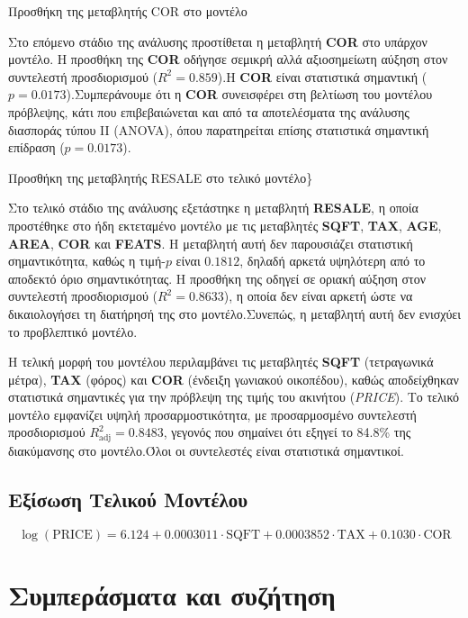 \documentclass[
  10pt,
]{article}
\begin{document}
Προσθήκη της μεταβλητής COR στο μοντέλο

Στο επόμενο στάδιο της ανάλυσης προστίθεται η μεταβλητή \textbf{COR} στο
υπάρχον μοντέλο. Η προσθήκη της \textbf{COR} οδήγησε σεμικρή αλλά
αξιοσημείωτη αύξηση στον συντελεστή προσδιορισμού (\(R^2 = 0.859\)).Η
\textbf{COR} είναι στατιστικά σημαντική (\(p = 0.0173\)).Συμπεράνουμε
ότι η \textbf{COR} συνεισφέρει στη βελτίωση του μοντέλου πρόβλεψης, κάτι
που επιβεβαιώνεται και από τα αποτελέσματα της ανάλυσης διασποράς τύπου
II (ANOVA), όπου παρατηρείται επίσης στατιστικά σημαντική επίδραση
(\(p = 0.0173\)).

Προσθήκη της μεταβλητής RESALE στο τελικό μοντέλο\}

Στο τελικό στάδιο της ανάλυσης εξετάστηκε η μεταβλητή \textbf{RESALE}, η
οποία προστέθηκε στο ήδη εκτεταμένο μοντέλο με τις μεταβλητές
\textbf{SQFT}, \textbf{TAX}, \textbf{AGE}, \textbf{AREA}, \textbf{COR}
και \textbf{FEATS}. Η μεταβλητή αυτή δεν παρουσιάζει στατιστική
σημαντικότητα, καθώς η τιμή-\(p\) είναι \(0.1812\), δηλαδή αρκετά
υψηλότερη από το αποδεκτό όριο σημαντικότητας. Η προσθήκη της οδηγεί σε
οριακή αύξηση στον συντελεστή προσδιορισμού (\(R^2 = 0.8633\)), η οποία
δεν είναι αρκετή ώστε να δικαιολογήσει τη διατήρησή της στο
μοντέλο.Συνεπώς, η μεταβλητή αυτή δεν ενισχύει το προβλεπτικό μοντέλο.

Η τελική μορφή του μοντέλου περιλαμβάνει τις μεταβλητές \textbf{SQFT}
(τετραγωνικά μέτρα), \textbf{TAX} (φόρος) και \textbf{COR} (ένδειξη
γωνιακού οικοπέδου), καθώς αποδείχθηκαν στατιστικά σημαντικές για την
πρόβλεψη της τιμής του ακινήτου (\textit{PRICE}). Το τελικό μοντέλο
εμφανίζει υψηλή προσαρμοστικότητα, με προσαρμοσμένο συντελεστή
προσδιορισμού \(R^2_{\text{adj}} = 0.8483\), γεγονός που σημαίνει ότι
εξηγεί το 84.8\% της διακύμανσης στο μοντέλο.Όλοι οι συντελεστές είναι
στατιστικά σημαντικοί.

\subsection*{Εξίσωση Τελικού Μοντέλου}

\begin{equation}
\log(\text{PRICE}) = 6.124 + 0.0003011 \cdot \text{SQFT} + 0.0003852 \cdot \text{TAX} + 0.1030 \cdot \text{COR}
\end{equation}

\section*{Συμπεράσματα και συζήτηση}
\end{document}
